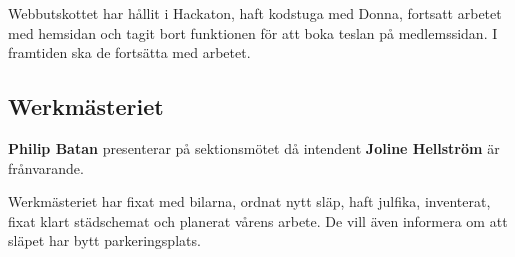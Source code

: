 \documentclass[../protokoll-vintermote-2024.tex]{subfiles}
\begin{document}
Webbutskottet har hållit i Hackaton, haft kodstuga med Donna, fortsatt arbetet med hemsidan och tagit bort funktionen för att boka teslan på medlemssidan. I framtiden ska de fortsätta med arbetet.
\subsection{Werkmästeriet}
\textbf{Philip Batan} presenterar på sektionsmötet då intendent \textbf{Joline Hellström} är frånvarande.

Werkmästeriet har fixat med bilarna, ordnat nytt släp, haft julfika, inventerat, fixat klart städschemat och planerat vårens arbete. De vill även informera om att släpet har bytt parkeringsplats.
\end{document}
